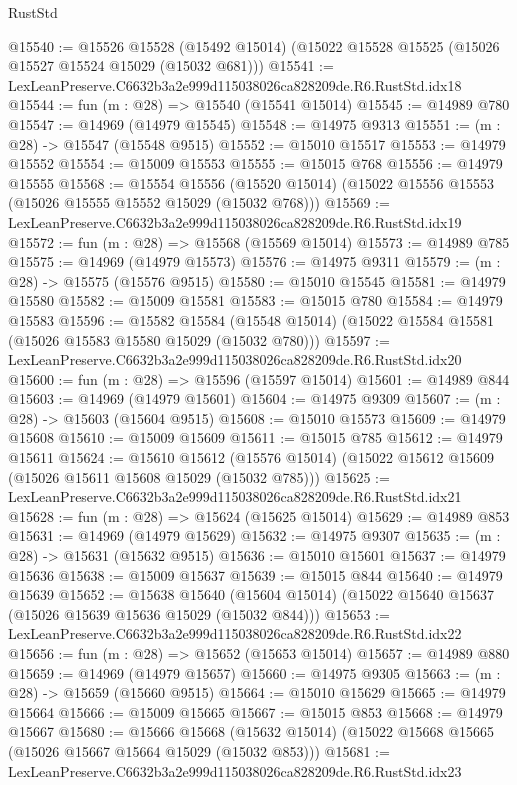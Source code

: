 \begin{lexlean}{RustStd}
\begin{coremodule}
@15540 := @15526
    @15528
    (@15492 @15014)
    (@15022 @15528 @15525 (@15026 @15527 @15524 @15029 (@15032 @681)))
@15541 := LexLeanPreserve.C6632b3a2e999d115038026ca828209de.R6.RustStd.idx18
@15544 := fun (m : @28) => @15540 (@15541 @15014)
@15545 := @14989 @780
@15547 := @14969 (@14979 @15545)
@15548 := @14975 @9313
@15551 := (m : @28) -> @15547 (@15548 @9515)
@15552 := @15010 @15517
@15553 := @14979 @15552
@15554 := @15009 @15553
@15555 := @15015 @768
@15556 := @14979 @15555
@15568 := @15554
    @15556
    (@15520 @15014)
    (@15022 @15556 @15553 (@15026 @15555 @15552 @15029 (@15032 @768)))
@15569 := LexLeanPreserve.C6632b3a2e999d115038026ca828209de.R6.RustStd.idx19
@15572 := fun (m : @28) => @15568 (@15569 @15014)
@15573 := @14989 @785
@15575 := @14969 (@14979 @15573)
@15576 := @14975 @9311
@15579 := (m : @28) -> @15575 (@15576 @9515)
@15580 := @15010 @15545
@15581 := @14979 @15580
@15582 := @15009 @15581
@15583 := @15015 @780
@15584 := @14979 @15583
@15596 := @15582
    @15584
    (@15548 @15014)
    (@15022 @15584 @15581 (@15026 @15583 @15580 @15029 (@15032 @780)))
@15597 := LexLeanPreserve.C6632b3a2e999d115038026ca828209de.R6.RustStd.idx20
@15600 := fun (m : @28) => @15596 (@15597 @15014)
@15601 := @14989 @844
@15603 := @14969 (@14979 @15601)
@15604 := @14975 @9309
@15607 := (m : @28) -> @15603 (@15604 @9515)
@15608 := @15010 @15573
@15609 := @14979 @15608
@15610 := @15009 @15609
@15611 := @15015 @785
@15612 := @14979 @15611
@15624 := @15610
    @15612
    (@15576 @15014)
    (@15022 @15612 @15609 (@15026 @15611 @15608 @15029 (@15032 @785)))
@15625 := LexLeanPreserve.C6632b3a2e999d115038026ca828209de.R6.RustStd.idx21
@15628 := fun (m : @28) => @15624 (@15625 @15014)
@15629 := @14989 @853
@15631 := @14969 (@14979 @15629)
@15632 := @14975 @9307
@15635 := (m : @28) -> @15631 (@15632 @9515)
@15636 := @15010 @15601
@15637 := @14979 @15636
@15638 := @15009 @15637
@15639 := @15015 @844
@15640 := @14979 @15639
@15652 := @15638
    @15640
    (@15604 @15014)
    (@15022 @15640 @15637 (@15026 @15639 @15636 @15029 (@15032 @844)))
@15653 := LexLeanPreserve.C6632b3a2e999d115038026ca828209de.R6.RustStd.idx22
@15656 := fun (m : @28) => @15652 (@15653 @15014)
@15657 := @14989 @880
@15659 := @14969 (@14979 @15657)
@15660 := @14975 @9305
@15663 := (m : @28) -> @15659 (@15660 @9515)
@15664 := @15010 @15629
@15665 := @14979 @15664
@15666 := @15009 @15665
@15667 := @15015 @853
@15668 := @14979 @15667
@15680 := @15666
    @15668
    (@15632 @15014)
    (@15022 @15668 @15665 (@15026 @15667 @15664 @15029 (@15032 @853)))
@15681 := LexLeanPreserve.C6632b3a2e999d115038026ca828209de.R6.RustStd.idx23

\end{coremodule}
\end{lexlean}
